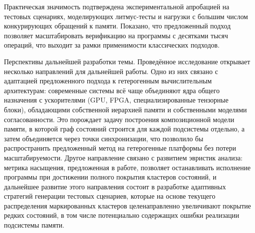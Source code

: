 Практическая значимость подтверждена экспериментальной апробацией на
тестовых сценариях, моделирующих литмус-тесты и нагрузки с большим
числом конкурирующих обращений к памяти. Показано, что предложенный
подход позволяет масштабировать верификацию на программы с десятками
тысяч операций, что выходит за рамки применимости классических подходов.

Перспективы дальнейшей разработки темы. Проведённое исследование
открывает несколько направлений для дальнейшей работы. Одно из них
связано с адаптацией предложенного подхода к гетерогенным
вычислительным архитектурам: современные системы всё чаще объединяют
ядра общего назначения с ускорителями (GPU, FPGA, специализированные
тензорные блоки), обладающими собственной иерархией памяти и
собственными моделями согласованности. Это порождает задачу построения
композиционной модели памяти, в которой граф состояний строится для
каждой подсистемы отдельно, а затем объединяется через точки
синхронизации, что позволило бы распространить предложенный метод на
гетерогенные платформы без потери масштабируемости. Другое направление
связано с развитием эвристик анализа: метрика насыщения, предложенная
в работе, позволяет останавливать исполнение программы при достижении
полного покрытия кластеров состояний, и дальнейшее развитие этого
направления состоит в разработке адаптивных стратегий генерации
тестовых сценариев, которые на основе текущего распределения
маркированных кластеров целенаправленно увеличивают покрытие редких
состояний, в том числе потенциально содержащих ошибки реализации
подсистемы памяти.
